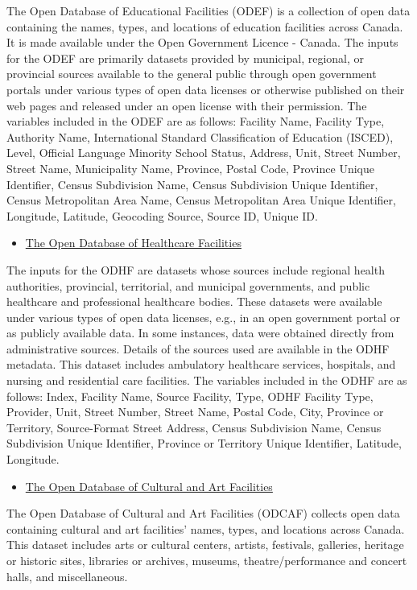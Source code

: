 \documentclass[12pt,twoside]{reedthesis}
\providecommand{\tightlist}{%
  \setlength{\itemsep}{0pt}\setlength{\parskip}{0pt}}
\begin{document}
The Open Database of Educational Facilities (ODEF) is a collection of open data containing the names, types, and locations of education facilities across Canada. It is made available under the Open Government Licence - Canada. The inputs for the ODEF are primarily datasets provided by municipal, regional, or provincial sources available to the general public through open government portals under various types of open data licenses or otherwise published on their web pages and released under an open license with their permission. The variables included in the ODEF are as follows: Facility Name, Facility Type, Authority Name, International Standard Classification of Education (ISCED), Level, Official Language Minority School Status, Address, Unit, Street Number, Street Name, Municipality Name, Province, Postal Code, Province Unique Identifier, Census Subdivision Name, Census Subdivision Unique Identifier, Census Metropolitan Area Name, Census Metropolitan Area Unique Identifier, Longitude, Latitude, Geocoding Source, Source ID, Unique ID.
\begin{itemize}
\tightlist
\item
  \href{https://www.statcan.gc.ca/en/lode/databases/odhf}{The Open Database of Healthcare Facilities}
\end{itemize}
The inputs for the ODHF are datasets whose sources include regional health authorities, provincial, territorial, and municipal governments, and public healthcare and professional healthcare bodies. These datasets were available under various types of open data licenses, e.g., in an open government portal or as publicly available data. In some instances, data were obtained directly from administrative sources. Details of the sources used are available in the ODHF metadata. This dataset includes ambulatory healthcare services, hospitals, and nursing and residential care facilities. The variables included in the ODHF are as follows: Index, Facility Name, Source Facility, Type, ODHF Facility Type, Provider, Unit, Street Number, Street Name, Postal Code, City, Province or Territory, Source-Format Street Address, Census Subdivision Name, Census Subdivision Unique Identifier, Province or Territory Unique Identifier, Latitude, Longitude.
\begin{itemize}
\tightlist
\item
  \href{https://www.statcan.gc.ca/en/lode/databases/odcaf}{The Open Database of Cultural and Art Facilities}
\end{itemize}
The Open Database of Cultural and Art Facilities (ODCAF) collects open data containing cultural and art facilities' names, types, and locations across Canada. This dataset includes arts or cultural centers, artists, festivals, galleries, heritage or historic sites, libraries or archives, museums, theatre/performance and concert halls, and miscellaneous.
\end{document}

